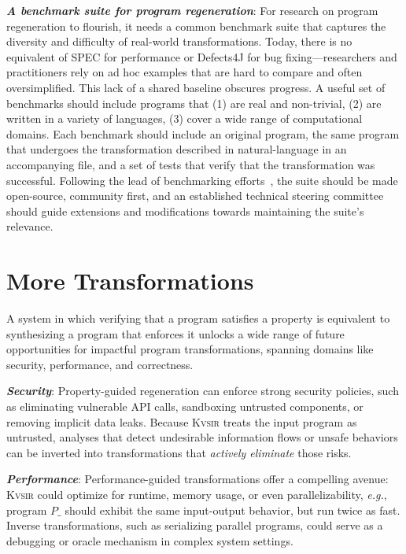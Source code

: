 \documentclass[sigplan,review,anonymous,10pt]{acmart}
\def\eg{{\em e.g.}, }
\newcommand{\sys}{{\scshape Kv{\textalpha}sir}\xspace}
\newcommand{\heading}[1]{\vspace{2pt}\noindent\textbf{\emph{#1}}:\enspace}
\begin{document}
\heading{A benchmark suite for program regeneration} %
For research on program regeneration to flourish, it needs a common benchmark
suite that captures the diversity and difficulty of real-world transformations.
Today, there is no equivalent of SPEC for performance or Defects4J for bug
fixing---researchers and practitioners rely on ad hoc examples that are hard to compare and often
oversimplified.
This lack of a shared baseline obscures progress. 
A useful set of benchmarks should include
programs that
(1) are real and non-trivial,
(2) are written in a variety of languages, 
(3) cover a wide range of computational domains.
Each benchmark should include an original program, 
the same program that undergoes the transformation described in natural-language 
in an accompanying file, and a set of tests that verify that the transformation was successful.
Following the lead of benchmarking efforts~\cite{SPEC_CPU2017, dacapo2006, koala:atc:2025}, the suite should be made open-source, community 
first, and an established technical steering committee should guide extensions and modifications towards maintaining the suite's relevance.




\section{More Transformations}
\label{sec:discussion}


A system in which verifying that a program satisfies a property is equivalent
to synthesizing a program that enforces it unlocks a wide range of future
opportunities for impactful program transformations, spanning domains like security,
performance, and correctness.

\heading{Security}
Property-guided regeneration can enforce strong security 
policies, such as eliminating vulnerable API calls, sandboxing 
untrusted components, or removing implicit data leaks. 
Because \sys treats the input program as untrusted, 
analyses that detect undesirable information flows or unsafe 
behaviors can be inverted into transformations that 
\emph{actively eliminate} those risks.

\heading{Performance}
Performance-guided transformations offer a compelling avenue: \sys
could optimize for runtime, memory usage, or even parallelizability, \eg
program $P\_$ should exhibit the same input-output behavior, but run twice as fast.
Inverse
transformations, such as serializing parallel programs, could serve as
a debugging or oracle mechanism in complex system settings.
\end{document}
